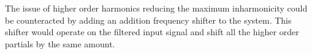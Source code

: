 		The issue of higher order harmonics reducing the maximum inharmonicity could be counteracted by adding an
		addition frequency shifter to the system. This shifter would operate on the filtered input signal and shift
		all the higher order partials by the same amount.

